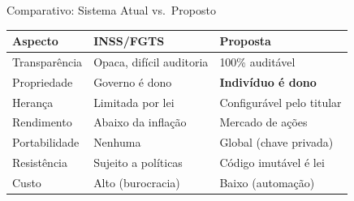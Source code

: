 \documentclass{libs/ufc_format}
\begin{document}
\begin{frame}{Comparativo: Sistema Atual vs.\ Proposto}
    \begin{table}
        \centering
        \small
        \begin{tabular}{p{2.2cm}p{3.5cm}p{3.5cm}}
            \toprule
            \textbf{Aspecto} & \textbf{INSS/FGTS} & \textbf{Proposta} \\
            \midrule
            Transparência & Opaca, difícil auditoria & 100\% auditável \\
            Propriedade & Governo é dono & \textbf{Indivíduo é dono} \\
            Herança & Limitada por lei & Configurável pelo titular \\
            Rendimento & Abaixo da inflação & Mercado de ações \\
            Portabilidade & Nenhuma & Global (chave privada) \\
            Resistência & Sujeito a políticas & Código imutável é lei \\
            Custo & Alto (burocracia) & Baixo (automação) \\
            \bottomrule
        \end{tabular}
    \end{table}

    \vspace{0.2cm}

\end{frame}

\end{document}
